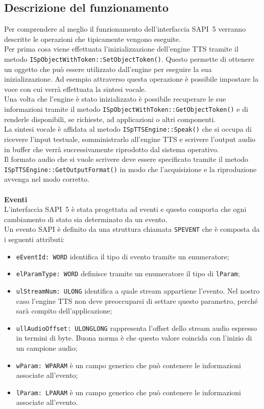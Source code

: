 \subsection{Descrizione del funzionamento}
Per comprendere al meglio il funzionamento dell'interfaccia SAPI~5 verranno descritte le operazioni che tipicamente vengono eseguite.\\
Per prima cosa viene effettuata l'inizializzazione dell'engine TTS tramite il metodo \texttt{ISpObjectWithToken::SetObjectToken()}. Questo permette di ottenere un oggetto che può essere utilizzato dall'engine per eseguire la sua inizializzazione.
Ad esempio attraverso questa operazione è possibile impostare la voce con cui verrà effettuata la sintesi vocale.\\
Una volta che l'engine è stato inizializzato è possibile recuperare le sue informazioni tramite il metodo \texttt{ISpObjectWithToken::GetObjectToken()} e di renderle disponibili, se richieste, ad applicazioni o altri componenti.\\
La sintesi vocale è affidata al metodo \texttt{ISpTTSEngine::Speak()} che si occupa di ricevere l'input testuale, somministrarlo all'engine TTS e scrivere l'output audio in buffer che verrà successivamente riprodotto dal sistema operativo.\\
Il formato audio che si vuole scrivere deve essere specificato tramite il metodo \texttt{ISpTTSEngine::GetOutputFormat()} in modo che l'acquisizione e la riproduzione avvenga nel modo corretto.\\\\
\textbf{Eventi}\\
L'interfaccia SAPI~5 è stata progettata ad eventi e questo comporta che ogni cambiamento di stato sia determinato da un evento.\\
Un evento SAPI è definito da una struttura chiamata \texttt{SPEVENT} che è composta da i seguenti attributi:
\begin{itemize}
	\item \texttt{eEventId: WORD} identifica il tipo di evento tramite un enumeratore;
	\item \texttt{elParamType: WORD} definisce tramite un enumeratore il tipo di \texttt{lParam};
	\item \texttt{ulStreamNum: ULONG} identifica a quale stream appartiene l'evento. Nel nostro caso l'engine TTS non deve preoccuparsi di settare questo parametro, perché sarà compito dell'applicazione;
	\item \texttt{ullAudioOffset: ULONGLONG} rappresenta l'offset dello stream audio espresso in termini di byte. Buona norma è che questo valore coincida con l'inizio di un campione audio;
	\item \texttt{wParam: WPARAM} è un campo generico che può contenere le informazioni associate all'evento;
	\item \texttt{lParam: LPARAM} è un campo generico che può contenere le informazioni associate all'evento.
\end{itemize}
